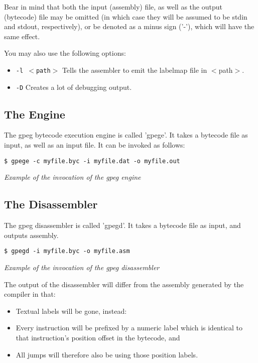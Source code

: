 Bear in mind that both the input (assembly) file, as well as the
output (bytecode) file may be omitted (in which case they will be
assumed to be stdin and stdout, respectively), or be denoted as
a minus sign ('-'), which will have the same effect.

You may also use the following options:

\begin{itemize}
\item \texttt{-l $<$path$>$} Tells the assembler to emit the labelmap
      file in $<$path$>$.
\item \texttt{-D} Creates a lot of debugging output.
\end{itemize}

\subsection{The Engine}

The gpeg bytecode execution engine is called 'gpege'.
It takes a bytecode file as input, as well as an input file.
It can be invoked as follows:

\begin{myquote}
\begin{verbatim}
$ gpege -c myfile.byc -i myfile.dat -o myfile.out
\end{verbatim}
\end{myquote}
\textit{Example of the invocation of the gpeg engine}

\subsection{The Disassembler}

The gpeg disassembler is called 'gpegd'.
It takes a bytecode file as input, and outputs assembly.

\begin{myquote}
\begin{verbatim}
$ gpegd -i myfile.byc -o myfile.asm
\end{verbatim}
\end{myquote}
\textit{Example of the invocation of the gpeg disassembler}

The output of the disassembler will differ from the assembly
generated by the compiler in that:

\begin{itemize}
\item Textual labels will be gone, instead:
\item Every instruction will be prefixed by a numeric label which
      is identical to that instruction's position offset in the bytecode, and
\item All jumps will therefore also be using those position labels.
\end{itemize}

